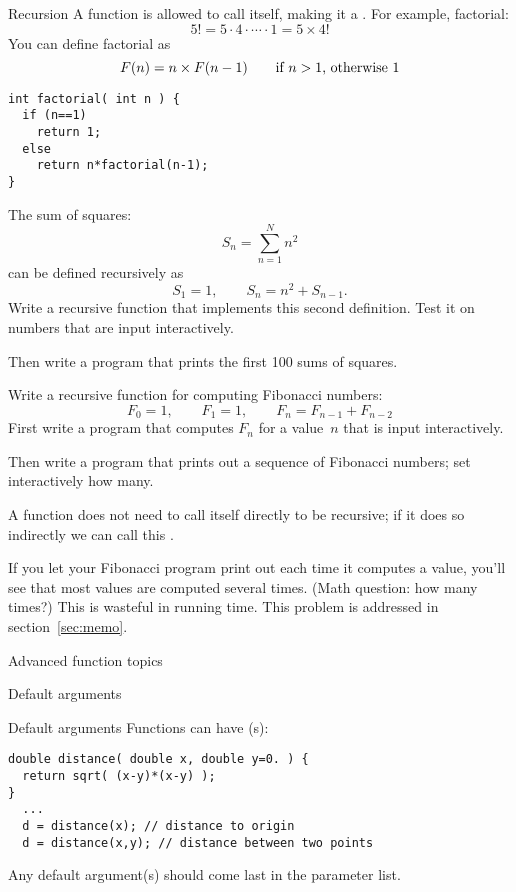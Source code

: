 \begin{slide}{Recursion}
  \label{sl:func-recur}
  A function is allowed to call itself, making it a .
  For example, factorial:
  \[ 5! = 5\cdot 4 \cdot \cdots \cdot 1 = 5 \times 4! \]
  You can define factorial as
  \[ F(n) = n \times F(n-1) \qquad \hbox{if $n>1$, otherwise~$1$} \]
\begin{lstlisting}
int factorial( int n ) {
  if (n==1)
    return 1;
  else
    return n*factorial(n-1);
}
\end{lstlisting}
\end{slide}

\begin{exercise}
  \label{ex:recur-sum}
  The sum of squares:
  \[ S_n = \sum_{n=1}^N n^2 \]
  can be defined recursively as
  \[ S_1=1,\qquad S_n = n^2 + S_{n-1}. \]
  Write a recursive function that implements this second definition.
  Test it on numbers that are input interactively.

  Then write a program that prints the first 100 sums of squares.
\end{exercise}

\begin{exercise}
  \label{ex:recur-fib}
  Write a recursive function for computing Fibonacci numbers:
  \[ F_0=1,\qquad F_1=1,\qquad F_{n}=F_{n-1}+F_{n-2} \]
  First write a program that computes $F_n$ for a value~$n$ that is
  input interactively.

  Then write a program that prints out a sequence of Fibonacci
  numbers; set interactively how many.
\end{exercise}

\begin{remark}
  A function does not need to call itself directly to be recursive; if
  it does so indirectly we can call this .
\end{remark}

\begin{remark}
  If you let your Fibonacci program print out each time it computes a
  value, you'll see that most values are computed several times. (Math
  question: how many times?) This is wasteful in running time. This
  problem is addressed in section~\ref{sec:memo}.
\end{remark}

 {Advanced function topics}

 {Default arguments}

\begin{block}{Default arguments}
  \label{sl:def-arg}
  Functions can have (s):
\begin{lstlisting}
double distance( double x, double y=0. ) {
  return sqrt( (x-y)*(x-y) );
}
  ...
  d = distance(x); // distance to origin
  d = distance(x,y); // distance between two points
\end{lstlisting}
Any default argument(s) should come last in the parameter list.
\end{block}

